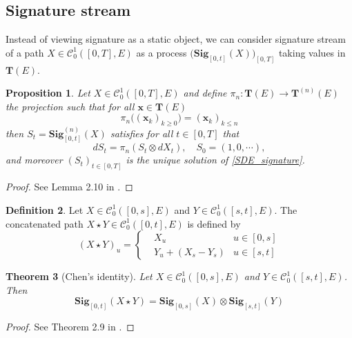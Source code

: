 \documentclass[12pt]{report}
\newtheorem{theorem}{Theorem}[chapter]
\newtheorem{proposition}[theorem]{Proposition}
\theoremstyle{definition}
\newtheorem{definition}[theorem]{Definition}
\theoremstyle{remark}
\begin{document}
\subsection{Signature stream}
Instead of viewing signature as a static object, we can consider signature stream of a path $X \in \mathcal{C}^{1}_{0}([0,T],E)$ as a process $\big(\mathbf{Sig}_{[0,t]}(X)\big)_{[0,T]}$ taking values in $\mathbf{T}(E)$.
\begin{proposition}
  Let $X \in \mathcal{C}^{1}_{0}([0,T],E)$ and define $\pi_{n} \colon \mathbf{T}(E) \to \mathbf{T}^{(n)}(E)$ the projection such that for all $\mathbf{x} \in \mathbf{T}(E)$ 
  \begin{equation}\label{projection}
    \pi_{n}\big((\mathbf{x}_{k})_{k\geq 0}\big) = (\mathbf{x}_{k})_{k\leq n}
  \end{equation}
  then $S_{t} = \mathbf{Sig}^{(n)}_{[0,t]}(X)$ satisfies for all $t \in [0,T]$ that 
  \begin{equation}\label{SDE_signature}
    dS_{t} = \pi_{n}(S_{t}\otimes dX_{t}),\quad S_{0} = (1,0,\cdots),
  \end{equation} 
  and moreover $(S_{t})_{t \in [0,T]}$ is the unique solution of \eqref{SDE_signature}. 
\end{proposition}
\begin{proof}
  See Lemma 2.10 in \cite{lyons2007differential}.
\end{proof}


\begin{definition}
  Let $X \in \mathcal{C}^{1}_{0}([0,s],E)$ and  $Y \in \mathcal{C}^{1}_{0}([s,t],E)$. The concatenated path $X\star Y \in\mathcal{C}^{1}_{0}([0,t],E) $ is defined by 
  \begin{equation}
    (X\star Y)_{u} = \left\{\begin{aligned}
      &X_{u} &u\in [0,s]\\
      &Y_{u} + (X_{s} - Y_{s}) &u\in [s,t]
    \end{aligned}\right.
  \end{equation}
\end{definition}
\begin{theorem}[Chen's identity]
  Let $X \in \mathcal{C}^{1}_{0}([0,s],E)$ and  $Y \in \mathcal{C}^{1}_{0}([s,t],E)$. Then 
  \begin{equation}
    \mathbf{Sig}_{[0,t]}(X\star Y) = \mathbf{Sig}_{[0,s]}(X) \otimes \mathbf{Sig}_{[s,t]}(Y)
  \end{equation}
\end{theorem}
\begin{proof}
  See Theorem 2.9 in \cite{lyons2007differential}.
\end{proof}
\end{document}
